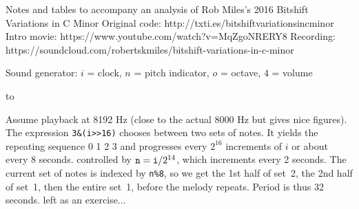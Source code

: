 
\bigskip\noindent
Notes and tables to accompany an analysis of\newline
{\bs Rob Miles}'s 2016 {\bs Bitshift Variations in C Minor}
\smallskip\noindent
Original code: http://txti.es/bitshiftvariationsincminor\newline
Intro movie: https://www.youtube.com/watch?v=MqZgoNRERY8\newline
Recording: https://soundcloud.com/robertskmiles/bitshift-variations-in-c-minor

\medskip
{}

\medskip
{}
\medskip
{}
\medskip
{}
\medskip
\centerline{} %
\centerline{Sound generator:
 $i$ = clock, $n$ = pitch indicator, $o$ = octave, $4$ = volume}

\medskip
{}
\halign to

\smallskip
{}
\smallskip\noindent
Assume playback at 8192 Hz (close to the actual 8000 Hz
but gives nice figures).
The expression {\tt 3\&(i>>16)} chooses between two sets of notes.
It yields the repeating sequence 0 1 2 3 and progresses every $2^{16}$
increments of $i$ or about every 8 seconds.
\smallskip
{}
\smallskip
{} controlled by ${\tt n}={\tt i}/2^{14}$,
which increments every 2 seconds. The current set of notes
is indexed by {\tt n\%8}, so we get the 1st half of set~2,
the 2nd half of set~1, then the entire set~1, before the
melody repeats. Period is thus 32 seconds.
\vskip6mm
 left as an exercise...

